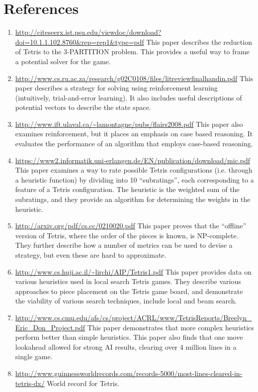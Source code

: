 \documentclass[12pt]{article}
\begin{document}
\section{References}
\begin{enumerate}
\item \url{http://citeseerx.ist.psu.edu/viewdoc/download?doi=10.1.1.102.8760&rep=rep1&type=pdf}
This paper describes the reduction of Tetris to the 3-PARTITION problem. This provides a useful way to frame a potential solver for the game.
\item \url{http://www.cs.ru.ac.za/research/g02C0108/files/litreviewfinalhandin.pdf}
This paper describes a strategy for solving using reinforcement learning (intuitively, trial-and-error learning). It also includes useful descriptions of potential vectors to describe the state space.
\item \url{http://www.ift.ulaval.ca/~lamontagne/pubs/flairs2008.pdf}
This paper also examines reinforcement, but it places an emphasis on case based reasoning. It evaluates the performance of an algorithm that employs case-based reasoning.
\item \url{https://www2.informatik.uni-erlangen.de/EN/publication/download/mic.pdf}
This paper examines a way to rate possible Tetris configurations (i.e. through a heuristic function) by dividing into 10 “subratings”, each corresponding to a feature of a Tetris configuration. The heuristic is the weighted sum of the subratings, and they provide an algorithm for determining the weights in the heuristic.
\item   \url{http://arxiv.org/pdf/cs.cc/0210020.pdf}
This paper proves that the “offline” version of Tetris, where the order of the pieces is known, is NP-complete. They further describe how a number of metrics can be used to devise a strategy, but even these are hard to approximate.
\item \url{http://www.cs.huji.ac.il/~lirchi/AIP/Tetris1.pdf}
This paper provides data on various heuristics used in local search Tetris games. They describe various approaches to piece placement on the Tetris game board, and demonstrate the viability of various search techniques, include local and beam search.
\item \url{http://www.cs.cmu.edu/afs/cs/project/ACRL/www/TetrisReports/Breelyn_Eric_Don_Project.pdf}
This paper demonstrates that more complex heuristics perform better than simple heuristics. This paper also finds that one move lookahead allowed for strong AI results, clearing over 4 million lines in a single game.
\item \url{http://www.guinnessworldrecords.com/records-5000/most-lines-cleared-in-tetris-dx/}
World record for Tetris.
\end{enumerate}
\end{document}
